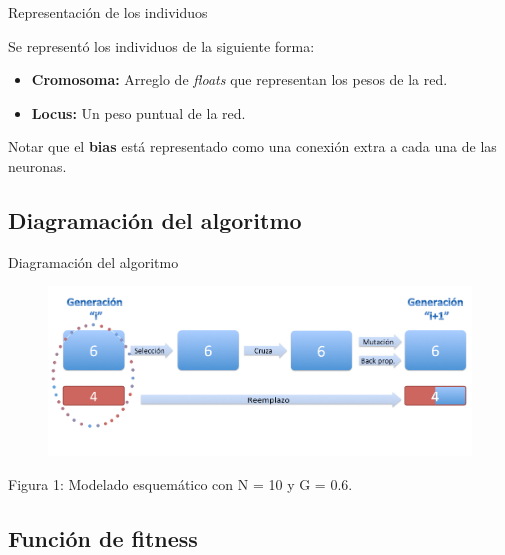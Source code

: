 \documentclass{beamer}
\begin{document}
\begin{frame}{Representación de los individuos}
\par Se representó los individuos de la siguiente forma: \\
\begin{itemize}
\item \textbf{Cromosoma:} Arreglo de \textit{floats} que representan los pesos de la red.
\item \textbf{Locus:} Un peso puntual de la red.
\end{itemize}

\par Notar que el \textbf{bias} está representado como una conexión extra a cada una de las neuronas.
\end{frame}

\subsection{Diagramación del algoritmo}

\begin{frame}{Diagramación del algoritmo}
\begin{figure}[H]
\begin{center}
\includegraphics[scale=1.30]{./images/AlgGenModelado.png}
\label{modelado}
\end{center}
\end{figure}

\begin{center}
\par Figura 1: Modelado esquemático con N = 10 y G = 0.6.
\end{center}
\end{frame}

\subsection{Función de fitness}
\end{document}
